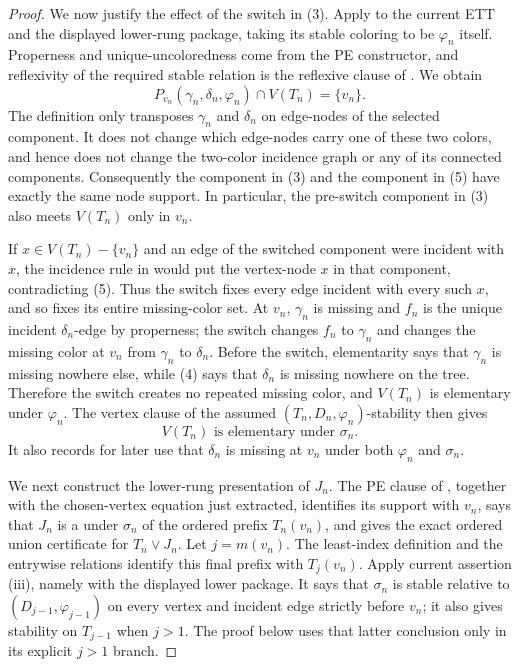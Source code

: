 \begin{proof}
We now justify the effect of the switch in (3).  Apply
 to the current ETT and the displayed lower-rung
package, taking its stable coloring to be $\varphi_n$ itself.  Properness
and unique-uncoloredness come from the PE constructor, and reflexivity of
the required stable relation is the reflexive clause of .
We obtain
\[
 P_{v_n}(\gamma_n,\delta_n,\varphi_n)\cap V(T_n)=\{v_n\}.       \tag{5}
\]
The definition  only transposes
$\gamma_n$ and $\delta_n$ on edge-nodes of the selected component.  It
does not change which edge-nodes carry one of these two colors, and hence
does not change the two-color incidence graph or any of its connected
components.  Consequently the component in (3) and the component in (5)
have exactly the same node support.  In particular, the pre-switch
component in (3) also meets $V(T_n)$ only in $v_n$.

If $x\in V(T_n)-\{v_n\}$ and an edge of the switched component were
incident with $x$, the incidence rule in
 would put the vertex-node $x$ in that
component, contradicting (5).  Thus the switch fixes every edge incident
with every such $x$, and so fixes its entire missing-color set.  At
$v_n$, $\gamma_n$ is missing and $f_n$ is the unique incident
$\delta_n$-edge by properness; the switch changes $f_n$ to
$\gamma_n$ and changes the missing color at $v_n$ from $\gamma_n$ to
$\delta_n$.  Before the switch, elementarity says that $\gamma_n$ is
missing nowhere else, while (4) says that $\delta_n$ is missing nowhere
on the tree.  Therefore the switch creates no repeated missing color, and
$V(T_n)$ is elementary under $\varphi_n$.  The vertex clause of the
assumed $(T_n,D_n,\varphi_n)$-stability then gives
\[
             V(T_n)\text{ is elementary under }\sigma_n.       \tag{1}
\]
It also records for later use that $\delta_n$ is missing at $v_n$ under
both $\varphi_n$ and $\sigma_n$.

We next construct the lower-rung presentation of $J_n$.  The PE clause of
, together with the chosen-vertex equation just
extracted, identifies its support with $v_n$, says that $J_n$ is a
 under $\sigma_n$ of the ordered prefix
$T_n(v_n)$, and gives the exact ordered union certificate for
$T_n\vee J_n$.  Let $j=m(v_n)$.  The least-index definition
 and the entrywise relations
 identify this final prefix with
$T_j(v_n)$.  Apply current assertion (iii), namely
 with the displayed lower package.  It says that
$\sigma_n$ is stable relative to $(D_{j-1},\varphi_{j-1})$ on every
vertex and incident edge strictly before $v_n$; it also gives stability
on $T_{j-1}$ when $j>1$.  The proof below uses that latter conclusion only
in its explicit $j>1$ branch.


\end{proof}
